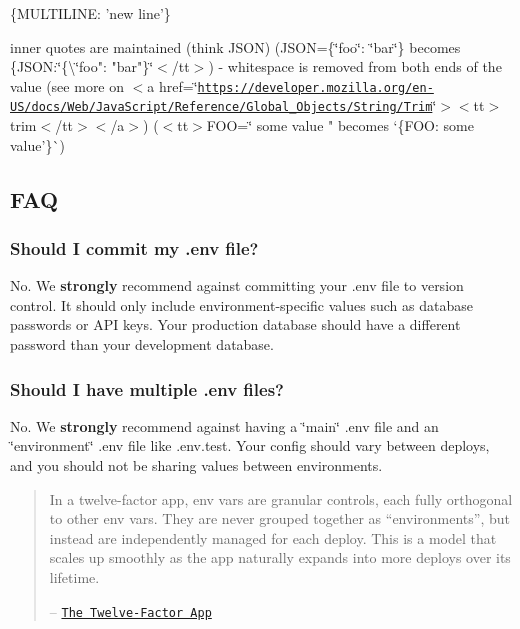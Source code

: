 \begin{DoxyCode}
\{MULTILINE: 'new
line'\}
\end{DoxyCode}



\begin{DoxyItemize}
\item inner quotes are maintained (think J\+S\+ON) ({\ttfamily J\+S\+ON=\{\char`\"{}foo\char`\"{}\+: \char`\"{}bar\char`\"{}\}} becomes {\ttfamily \{J\+S\+ON\+:\char`\"{}\{\textbackslash{}\char`\"{}foo"\+: "bar"\}\char`\"{}$<$/tt$>$)
-\/ whitespace is removed from both ends of the value (see more on $<$a href=\char`\"{}\href{https://developer.mozilla.org/en-US/docs/Web/JavaScript/Reference/Global_Objects/String/Trim}{\tt https\+://developer.\+mozilla.\+org/en-\/\+U\+S/docs/\+Web/\+Java\+Script/\+Reference/\+Global\+\_\+\+Objects/\+String/\+Trim}\char`\"{}$>$$<$tt$>$trim$<$/tt$>$$<$/a$>$) ($<$tt$>$\+F\+O\+O=\char`\"{} some value "} becomes `\{F\+OO\+: \textquotesingle{}some value'\}\`{})
\end{DoxyItemize}

\subsection*{F\+AQ}

\subsubsection*{Should I commit my {\ttfamily .env} file?}

No. We {\bfseries strongly} recommend against committing your {\ttfamily .env} file to version control. It should only include environment-\/specific values such as database passwords or A\+PI keys. Your production database should have a different password than your development database.

\subsubsection*{Should I have multiple {\ttfamily .env} files?}

No. We {\bfseries strongly} recommend against having a \char`\"{}main\char`\"{} {\ttfamily .env} file and an \char`\"{}environment\char`\"{} {\ttfamily .env} file like {\ttfamily .env.\+test}. Your config should vary between deploys, and you should not be sharing values between environments.

\begin{quote}
In a twelve-\/factor app, env vars are granular controls, each fully orthogonal to other env vars. They are never grouped together as “environments”, but instead are independently managed for each deploy. This is a model that scales up smoothly as the app naturally expands into more deploys over its lifetime.

– \href{http://12factor.net/config}{\tt The Twelve-\/\+Factor App} \end{quote}


